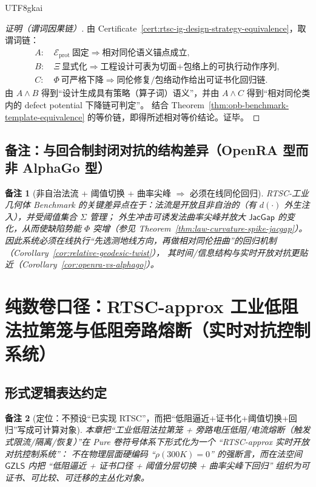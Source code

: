 \documentclass[12pt]{article}
\newtheorem{remark}{备注}[section]
\newcommand{\GZLS}{\ensuremath{\mathsf{GZLS}}}
\newcommand{\JacGap}{\ensuremath{\mathsf{JacGap}}}
\newcommand{\RTSC}{\textsf{RTSC}}
\begin{document}
\begin{CJK*}{UTF8}{gkai}
\begin{proof}[证明（谓词因果链）]
由 Certificate~\ref{cert:rtsc-ig-design-strategy-equivalence}，取谓词链：
\[
\begin{aligned}
A:&\ \mathcal{E}_{\mathrm{prot}}\ \text{固定}\Rightarrow \text{相对同伦语义锚点成立},\\
B:&\ \Xi\ \text{显式化}\Rightarrow \text{工程设计可表为切面+包络上的可执行动作序列},\\
C:&\ \Phi\ \text{可严格下降}\Rightarrow \text{同伦修复/包络动作给出可证书化回归链}.
\end{aligned}
\]
由 $A\wedge B$ 得到“设计生成具有策略（算子词）语义”，并由 $A\wedge C$ 得到“相对同伦类内的 defect potential 下降链可判定”。
结合 Theorem~\ref{thm:opb-benchmark-template-equivalence} 的等价链，即得所述相对等价结论。证毕。
\end{proof}

\subsection{备注：与回合制封闭对抗的结构差异（OpenRA 型而非 AlphaGo 型）}

\begin{remark}[非自治法流 + 阈值切换 + 曲率尖峰 $\Rightarrow$ 必须在线同伦回归]
\RTSC{}-工业几何体 Benchmark 的关键差异点在于：法流是开放且非自治的（有 $d(\cdot)$ 外生注入），并受阈值集合 $\Sigma$ 管理；
外生冲击可诱发法曲率尖峰并放大 $\JacGap$ 的变化，从而使缺陷势能 $\Phi$ 突增（参见 Theorem~\ref{thm:law-curvature-spike-jacgap}）。
因此系统必须在线执行“先选测地线方向，再做相对同伦扭曲”的回归机制（Corollary~\ref{cor:relative-geodesic-twist}），
其时间/信息结构与实时开放对抗更贴近（Corollary~\ref{cor:openra-vs-alphago}）。
\end{remark}

\clearpage
\section{纯数卷口径：\textsf{RTSC-approx} 工业低阻法拉第笼与低阻旁路熔断（实时对抗控制系统）}
\label{sec:puremath-rtsc-approx-lowres-cage-bypass}

\subsection{形式逻辑表达约定}

\begin{remark}[定位：不预设“已实现 RTSC”，而把“低阻逼近+证书化+阈值切换+回归”写成可计算对象]
本章把“工业低阻法拉第笼 + 旁路电压低阻/电流熔断（触发式限流/隔离/恢复）”在 Pure 卷符号体系下形式化为一个
``\textsf{RTSC-approx} 实时开放对抗控制系统''：
不在物理层面硬编码 ``$\rho(300K)=0$'' 的强断言，而在法空间 $\GZLS$ 内把
``低阻逼近 + 证书口径 + 阈值分层切换 + 曲率尖峰下回归'' 组织为可证书、可比较、可迁移的主丛化对象。
\end{remark}


\end{CJK*}
\end{document}
